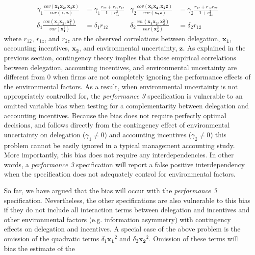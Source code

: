 \documentclass[12pt]{article}
\begin{document}
\begin{equation}\label{eq:omitted}
\begin{aligned}
\gamma_1 \frac{cov(\mathbf{x_1 x_2}, \mathbf{x_1 z})}{var(\mathbf{x_1 z})} &= 
\gamma_1 \frac{r_{2z} + r_{12} r_{1z}}{1 + r_{1z}^2}
&\gamma_2 \frac{cov(\mathbf{x_1 x_2}, \mathbf{x_2 z})}{var(\mathbf{x_2 z})} &= 
\gamma_2 \frac{r_{1z} + r_{12} r_{2z}}{1 + r_{2z}^2}
\\
\delta_1 \frac{cov(\mathbf{x_1 x_2}, \mathbf{x_1^2})}{var(\mathbf{x_1^2})} &= 
\delta_1 r_{12}
&\delta_2 \frac{cov(\mathbf{x_1 x_2}, \mathbf{x_2^2})}{var(\mathbf{x_2^2})} &= 
\delta_2 r_{12}
\end{aligned}
\end{equation}
where $r_{12}$, $r_{1z}$, and $r_{2z}$ are the observed correlations between delegation, $\mathbf{x_1}$, accounting incentives, $\mathbf{x_2}$, and environmental uncertainty, $\mathbf{z}$. As explained in the previous section, contingency theory implies that those empirical correlations between delegation, accounting incentives, and environmental uncertainty are different from 0 when firms are not completely ignoring the performance effects of the environmental factors. As a result, when environmental uncertainty is not appropriately controlled for, the \emph{performance 3} specification is vulnerable to an omitted variable bias when testing for a complementarity between delegation and accounting incentives. Because the bias does not require perfectly optimal decisions, and follows directly from the contingency effect of environmental uncertainty on delegation ($\gamma_1 \neq 0$) and accounting incentives ($\gamma_2 \neq 0$) this problem cannot be easily ignored in a typical management accounting study. More importantly, this bias does not require any interdependencies. In other words, a \emph{performance 3} specification will report a false positive interdependency when the specification does not adequately control for environmental factors. 

So far, we have argued that the bias will occur with the \emph{performance 3} specification. Nevertheless, the other specifications are also vulnerable to this bias if they do not include all interaction terms between delegation and incentives and other environmental factors (e.g. information asymmetry) with contingency effects on delegation and incentives.  A special case of the above problem is the omission of the quadratic terms $\delta_1 \mathbf{x_1}^2$ and $\delta_2 \mathbf{x_2}^2$. Omission of these terms will bias the estimate of the 
\end{document}
